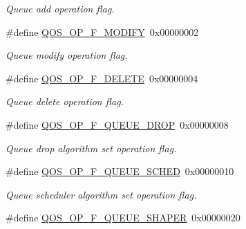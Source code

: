 \begin{DoxyCompactItemize}
\begin{DoxyCompactList}\small\item\em Queue add operation flag. \end{DoxyCompactList}\item 
\hypertarget{group__FAPI__QOS__QUEUE_ga7784ac1b56789390044395c968750dfb}{\#define \hyperlink{group__FAPI__QOS__QUEUE_ga7784ac1b56789390044395c968750dfb}{Q\-O\-S\-\_\-\-O\-P\-\_\-\-F\-\_\-\-M\-O\-D\-I\-F\-Y}~0x00000002}\label{group__FAPI__QOS__QUEUE_ga7784ac1b56789390044395c968750dfb}

\begin{DoxyCompactList}\small\item\em Queue modify operation flag. \end{DoxyCompactList}\item 
\hypertarget{group__FAPI__QOS__QUEUE_gafa18a9d931c39c4ad229c5c9680522ec}{\#define \hyperlink{group__FAPI__QOS__QUEUE_gafa18a9d931c39c4ad229c5c9680522ec}{Q\-O\-S\-\_\-\-O\-P\-\_\-\-F\-\_\-\-D\-E\-L\-E\-T\-E}~0x00000004}\label{group__FAPI__QOS__QUEUE_gafa18a9d931c39c4ad229c5c9680522ec}

\begin{DoxyCompactList}\small\item\em Queue delete operation flag. \end{DoxyCompactList}\item 
\hypertarget{group__FAPI__QOS__QUEUE_gae2e14dd5f31d858be56a4e8fd572390c}{\#define \hyperlink{group__FAPI__QOS__QUEUE_gae2e14dd5f31d858be56a4e8fd572390c}{Q\-O\-S\-\_\-\-O\-P\-\_\-\-F\-\_\-\-Q\-U\-E\-U\-E\-\_\-\-D\-R\-O\-P}~0x00000008}\label{group__FAPI__QOS__QUEUE_gae2e14dd5f31d858be56a4e8fd572390c}

\begin{DoxyCompactList}\small\item\em Queue drop algorithm set operation flag. \end{DoxyCompactList}\item 
\hypertarget{group__FAPI__QOS__QUEUE_ga1a11fb7eb4bfd2abdf7ea9eaed0a3aac}{\#define \hyperlink{group__FAPI__QOS__QUEUE_ga1a11fb7eb4bfd2abdf7ea9eaed0a3aac}{Q\-O\-S\-\_\-\-O\-P\-\_\-\-F\-\_\-\-Q\-U\-E\-U\-E\-\_\-\-S\-C\-H\-E\-D}~0x00000010}\label{group__FAPI__QOS__QUEUE_ga1a11fb7eb4bfd2abdf7ea9eaed0a3aac}

\begin{DoxyCompactList}\small\item\em Queue scheduler algorithm set operation flag. \end{DoxyCompactList}\item 
\hypertarget{group__FAPI__QOS__QUEUE_ga36afcc257c4b08f215030cc9dc02fbb7}{\#define \hyperlink{group__FAPI__QOS__QUEUE_ga36afcc257c4b08f215030cc9dc02fbb7}{Q\-O\-S\-\_\-\-O\-P\-\_\-\-F\-\_\-\-Q\-U\-E\-U\-E\-\_\-\-S\-H\-A\-P\-E\-R}~0x00000020}\label{group__FAPI__QOS__QUEUE_ga36afcc257c4b08f215030cc9dc02fbb7}


\end{DoxyCompactItemize}
